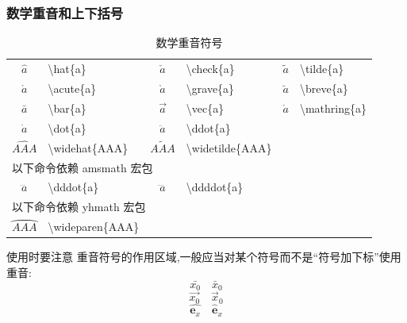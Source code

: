 \documentclass[a4paper]{ctexart}
\begin{document}
    \subsubsection{数学重音和上下括号}
    \begin{table}[H]
        \centering
        \caption{数学重音符号}
        \begin{tabular}{clclcl}
            \toprule
            $\hat{a}$           & \textbackslash hat\{a\}           & $\check{a}$           & \textbackslash check\{a\}             &
            $\tilde{a}$         & \textbackslash tilde\{a\}                                                                         \\
            $\acute{a}$         & \textbackslash acute\{a\}         & $\grave{a}$           & \textbackslash grave\{a\}             &
            $\breve{a}$         & \textbackslash breve\{a\}                                                                         \\
            $\bar{a}$           & \textbackslash bar\{a\}           & $\vec{a}$             & \textbackslash vec\{a\}               &
            $\mathring{a}$      & \textbackslash mathring\{a\}                                                                      \\
            $\dot{a}$           & \textbackslash dot\{a\}           & $\ddot{a}$            & \textbackslash ddot\{a\}              \\
            $\widehat{AAA}$     & \textbackslash widehat\{AAA\}     & $\widetilde{AAA}$     & \textbackslash widetilde\{AAA\}       \\
            \midrule
            \multicolumn{6}{l}{以下命令依赖 amsmath 宏包}\\
            $\dddot{a}$         & \textbackslash dddot\{a\}         & $\ddddot{a}$          & \textbackslash ddddot\{a\}            \\
            \midrule
            \multicolumn{6}{l}{以下命令依赖 yhmath 宏包}\\
            $\wideparen{AAA}$   & \textbackslash wideparen\{AAA\}                                                                   \\    
            \bottomrule
        \end{tabular}
    \end{table}
    使用时要注意 重音符号的作用区域,一般应当对某个符号而不是``符号加下标''使用重音:
    \[\bar{x_0} \quad \bar{x}_0 \]
    \[\vec{x_0} \quad \vec{x}_0 \]
    \[\hat{\mathbf{e}_x} \quad \hat{\mathbf{e}}_x \]
\end{document}
